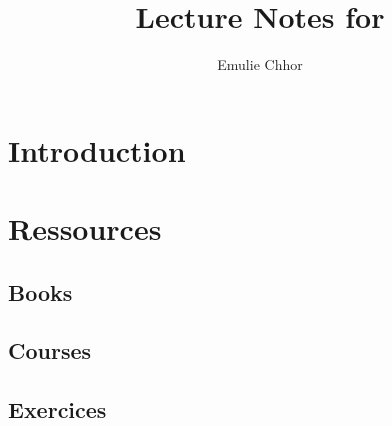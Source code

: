 \documentclass{article}
\begin{document}
\title{Lecture Notes for }
\author{Emulie Chhor}
\maketitle

\section*{Introduction}

\newtheorem{definition}{Definition}[subsection]
\newtheorem{theorem}{Theorem}[subsection]
\newtheorem{corollary}{Corollary}[subsection]
\newtheorem{lemma}[theorem]{Lemma}
\newtheorem{proposition}{Proposition}[section]
\newtheorem{axiom}{Axiome}
\newtheorem{property}{Propriété}[subsection]
\newtheorem*{remark}{Remarque}
\newtheorem*{problem}{Problème}
\newtheorem*{intuition}{Intuition}

\section{Ressources}%
\label{sec:Ressources}

\subsection{Books}%
\label{sub:Books}

\subsection{Courses}%
\label{sub:Courses}

\subsection{Exercices}%
\label{sub:Exercices}
\end{document}
